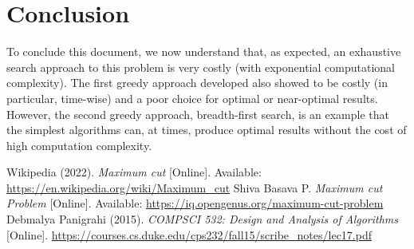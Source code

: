 \documentclass[]{revdetua}
\begin{document}
\section{Conclusion}

To conclude this document, we now understand that, as expected, an exhaustive search approach to this problem is very costly (with exponential computational complexity). The first greedy approach developed also showed to be costly (in particular, time-wise) and a poor choice for optimal or near-optimal results. However, the second greedy approach, breadth-first search, is an example that the simplest algorithms can, at times, produce optimal results without the cost of high computation complexity.

\begin{thebibliography}{00}

 Wikipedia (2022). \textit{Maximum cut} [Online]. Available: \url{https://en.wikipedia.org/wiki/Maximum_cut}
 Shiva Basava P. \textit{Maximum cut Problem} [Online]. Available: \url{https://iq.opengenus.org/maximum-cut-problem}
 Debmalya Panigrahi (2015). \textit{COMPSCI 532: Design and Analysis of Algorithms} [Online]. \url{https://courses.cs.duke.edu/cps232/fall15/scribe_notes/lec17.pdf}

\end{thebibliography}
\end{document}
